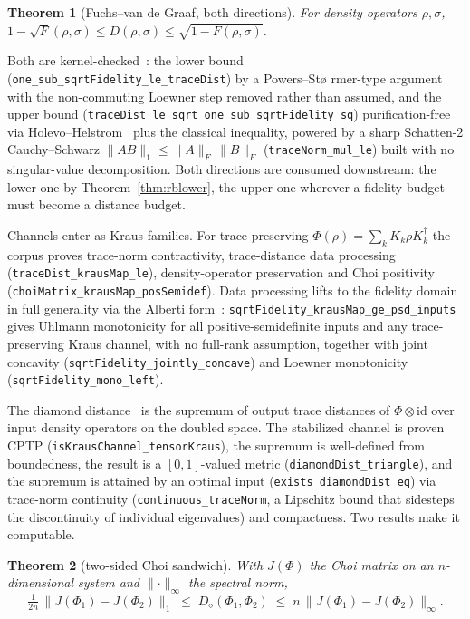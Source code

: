 \documentclass[aps,pra,reprint,nofootinbib,superscriptaddress]{revtex4-2}
\theoremstyle{plain}
\newtheorem{theorem}{Theorem}
\theoremstyle{definition}
\theoremstyle{remark}
\newcommand{\lean}[1]{\texttt{#1}}
\newcommand{\trnorm}[1]{\lVert #1 \rVert_{1}}
\newcommand{\opnorm}[1]{\lVert #1 \rVert_{\infty}}
\newcommand{\ddist}{D_{\diamond}}
\begin{document}
\begin{theorem}[Fuchs--van de Graaf, both directions]
\label{thm:fvdg}
For density operators $\rho,\sigma$,
$1 - \sqrt F(\rho,\sigma) \le D(\rho,\sigma) \le
\sqrt{1 - F(\rho,\sigma)}$.
\end{theorem}

Both are kernel-checked~\cite{FuchsvandeGraaf1999}: the lower bound
(\lean{one\_sub\_sqrtFidelity\_le\_traceDist}) by a Powers--St\o
rmer-type argument with the non-commuting Loewner step removed rather
than assumed, and the upper bound
(\lean{traceDist\_le\_sqrt\_one\_sub\_sqrtFidelity\_sq})
purification-free via Holevo--Helstrom~\cite{Helstrom1976} plus the
classical inequality, powered by a sharp Schatten-2 Cauchy--Schwarz
$\trnorm{AB} \le \lVert A\rVert_F\,\lVert B\rVert_F$
(\lean{traceNorm\_mul\_le}) built with no singular-value decomposition.
Both directions are consumed downstream: the lower one by
Theorem~\ref{thm:rblower}, the upper one wherever a fidelity budget must
become a distance budget.

Channels enter as Kraus families. For trace-preserving
$\Phi(\rho)=\sum_k K_k\rho K_k^{\dagger}$ the corpus proves trace-norm
contractivity, trace-distance data processing
(\lean{traceDist\_krausMap\_le}), density-operator preservation and Choi
positivity~\cite{Choi1975} (\lean{choiMatrix\_krausMap\_posSemidef}).
Data processing lifts to the fidelity domain in full generality via the
Alberti form~\cite{Alberti1983}:
\lean{sqrtFidelity\_krausMap\_ge\_psd\_inputs} gives Uhlmann monotonicity
for all positive-semidefinite inputs and any trace-preserving Kraus
channel, with no full-rank assumption, together with joint concavity
(\lean{sqrtFidelity\_jointly\_concave}) and Loewner monotonicity
(\lean{sqrtFidelity\_mono\_left}).

The diamond distance~\cite{Kitaev1997,Watrous2018} is the supremum of
output trace distances of $\Phi\otimes\mathrm{id}$ over input density
operators on the doubled space. The stabilized channel is proven CPTP
(\lean{isKrausChannel\_tensorKraus}), the supremum is well-defined from
boundedness, the result is a $[0,1]$-valued metric
(\lean{diamondDist\_triangle}), and the supremum is attained by an
optimal input (\lean{exists\_diamondDist\_eq}) via trace-norm continuity
(\lean{continuous\_traceNorm}, a Lipschitz bound that sidesteps the
discontinuity of individual eigenvalues) and compactness. Two results
make it computable.

\begin{theorem}[two-sided Choi sandwich]
\label{thm:sandwich}
With $J(\Phi)$ the Choi matrix on an $n$-dimensional system and
$\opnorm{\cdot}$ the spectral norm,
\[
\tfrac{1}{2n}\,\trnorm{J(\Phi_1)-J(\Phi_2)} \;\le\;
\ddist(\Phi_1,\Phi_2) \;\le\;
n\,\opnorm{J(\Phi_1)-J(\Phi_2)}.
\]
\end{theorem}
\end{document}

